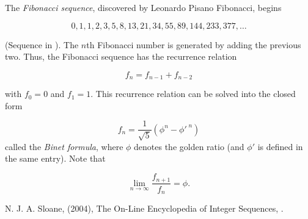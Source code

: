 \documentclass[12pt]{article}
\begin{document}
The \emph{Fibonacci sequence}, discovered by Leonardo Pisano Fibonacci, begins

$$ 0, 1, 1, 2, 3, 5 ,8 , 13, 21, 34, 55, 89, 144, 233, 377, \ldots $$

(Sequence  in \cite{OEIS}).
The $n$th Fibonacci number is generated by adding the previous two.  Thus, the Fibonacci sequence has the recurrence relation 

$$ f_n = f_{n-1} + f_{n-2} $$

with $f_0=0$ and $f_1 = 1$.  This recurrence relation can be solved into the closed form 

$$ f_n = \frac{1}{\sqrt{5}} \left( \phi^n - \phi'^{\;n} \right) $$
called the \emph{Binet formula}, where $\phi$ denotes the golden ratio (and $\phi'$ is defined in the same entry). Note that

$$ \lim_{n\rightarrow \infty} \frac{f_{n+1}}{f_n}   = \phi. $$

\begin{thebibliography}{15} 
N. J. A. Sloane, (2004), The On-Line Encyclopedia of Integer Sequences, .
\end{thebibliography}
\end{document}
